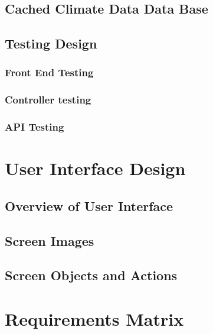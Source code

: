 \documentclass[onecolumn, draftclsnofoot,10pt, compsoc]{article}
\begin{document}
			\subsection{Cached Climate Data Data Base}

	\subsection{Testing Design}
		\subsubsection{Front End Testing}
	
		\subsubsection{Controller testing}
	
		\subsubsection{API Testing}
		
\section{User Interface Design}

	\subsection{Overview of User Interface}
	
	\subsection{Screen Images}
	
	\subsection{Screen Objects and Actions}

\section{Requirements Matrix}
\end{document}
